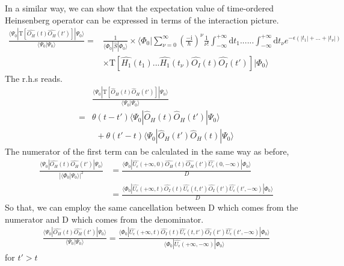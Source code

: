 In a similar way, we can show that  the expectation value of time-ordered Heinsenberg operator can be expressed in terms of the interaction picture.
\begin{align}\label{2.4.3}
\frac{\langle\Psi_0|\mathrm{T}[\hat{O_H}(t)\hat{O_H}(t')]|\Psi_0\rangle}{\langle\Psi_0|\Psi_0\rangle}=&\frac{1}{\langle\Phi_0|\hat{S}|\Phi_0\rangle}\times\langle\Phi_0|\sum_{\nu=0}^{\infty}(\frac{-\mathrm{i}}{\hbar})^{\nu} \frac{1}{\nu!} \int_{-\infty}^{+\infty}\mathrm{d}t_1......\int_{-\infty}^{+\infty}\mathrm{d}t_{\nu}e^{-\epsilon(|t_1|+...+|t_{\nu}|)} \nonumber\\
&\times \mathrm{T}[\hat{H_1}(t_1)...\hat{H_1}(t_{\nu})\hat{O_I}(t)\hat{O_I}(t')]|\Phi_0\rangle
\end{align}
The r.h.s reads.
\begin{align}
&\frac{\langle\Psi_0|\mathrm{T}[\hat O_{H}(t)\hat O_H (t')]|\Psi_0\rangle}{\langle\Psi_0|\Psi_0\rangle} \nonumber \\
=&\theta(t-t')\langle\Psi_0|\hat O_{H}(t)\hat O_H (t')|\Psi_0\rangle \nonumber \\
& \ \ +\theta(t'-t)\langle\Psi_0|\hat O_{H}(t')\hat O_H (t)|\Psi_0\rangle \nonumber 
\end{align}
The numerator of the first term can be calculated in the same way as before,
\begin{align}
\frac{\langle\Psi_0|\hat{O_H}(t)\hat{O_H}(t')|\Psi_0\rangle}{|\langle\Phi_0|\Psi_0\rangle|^2}&=\frac{\langle\Phi_0|\hat{U_{\epsilon}}(+\infty,0)\hat{O_H}(t)\hat{O_H}(t')\hat{U_{\epsilon}}(0,-\infty)|\Phi_0\rangle}{D} \nonumber \\
&=\frac{\langle\Phi_0|\hat{U_{\epsilon}}(+\infty,t)\hat{O_I}(t)\hat{U_{\epsilon}}(t,t')\hat{O_I}(t')\hat{U_{\epsilon}}(t',-\infty)|\Phi_0\rangle}{D} \nonumber
\end{align}
So that, we can employ the same cancellation between D which comes from the numerator and D which comes from the denominator.
\begin{align}
\frac{\langle\Psi_0|\hat{O_H}(t)\hat{O_H}(t')|\Psi_0\rangle}{\langle\Psi_0|\Psi_0\rangle}=\frac{\langle\Phi_0|\hat{U_{\epsilon}}(+\infty,t)\hat{O_I}(t)\hat{U_{\epsilon}}(t,t')\hat{O_I}(t')\hat{U_{\epsilon}}(t',-\infty)|\Phi_0\rangle}{\langle\Phi_0|\hat{U_{\epsilon}}(+\infty,-\infty)|\Phi_0\rangle}\nonumber
\end{align}
for $t'>t$

